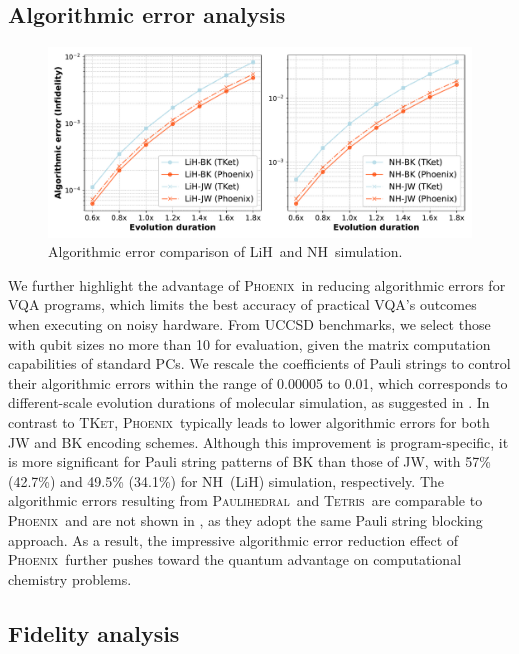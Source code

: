 \documentclass[conference]{IEEEtran}
\newcommand{\phoenix}{\textsc{Phoenix}}
\newcommand{\tket}{\textsc{TKet}}
\newcommand{\tetris}{\textsc{Tetris}}
\newcommand{\paulihedral}{\textsc{Paulihedral}}
\newcommand{\LiH}{LiH}
\newcommand{\NH}{NH}
\begin{document}
\subsection{Algorithmic error analysis}


    \begin{figure}[tbp]
        \centering
        \includegraphics[width=\columnwidth]{figures/algo_err.pdf}
        \caption{Algorithmic error comparison of \LiH\ and \NH\ simulation.  }
        \label{fig:algo-err}
    \end{figure}

    We further highlight the advantage of \phoenix\ in reducing algorithmic errors for VQA programs, which limits the best accuracy of practical VQA's outcomes when executing on noisy hardware. From UCCSD benchmarks, we select those with qubit sizes no more than 10 for evaluation, given the matrix computation capabilities of standard PCs. We rescale the coefficients of Pauli strings to control their algorithmic errors within the range of 0.00005 to 0.01, which corresponds to different-scale evolution durations of molecular simulation, as suggested in . In contrast to \tket, \phoenix\ typically leads to lower algorithmic errors for both JW and BK encoding schemes. Although this improvement is program-specific, it is more significant for Pauli string patterns of BK than those of JW, with 57\% (42.7\%) and 49.5\% (34.1\%) for \NH\ (\LiH) simulation, respectively. The algorithmic errors resulting from \paulihedral\ and \tetris\ are comparable to \phoenix\ and are not shown in , as they adopt the same Pauli string blocking approach. As a result, the impressive algorithmic error reduction effect of \phoenix\ further pushes toward the quantum advantage on computational chemistry problems.


\subsection{Fidelity analysis}
\end{document}
